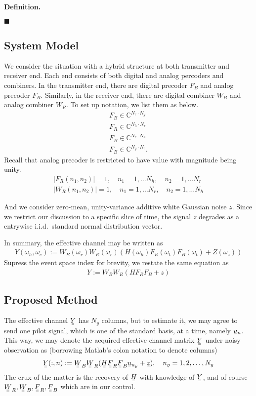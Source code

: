 \documentclass[12pt]{article}
\newcommand{\MB}[1]{\mathbb{#1}}
\newcommand{\V}[1]{\stackunder[1.2pt]{$#1$}{\rule{.9ex}{.075ex}}}
\newcommand{\M}[1]{\V{\V{#1}}}
\newcounter{NumResult}
\newcommand{\myCount}
{
   \stepcounter{NumResult}
   \textbf{\arabic{NumResult}}
}
\newcommand {\Result} [2]
{
   \bigskip
   \myCount \textbf{#1} \par
   {#2} \par
   \hfill \(\blacksquare\)
   \bigskip
}
\begin{document}
\Result
{Definition.}
{
}

\subsection{System Model}

We consider the situation with a hybrid structure at both transmitter and receiver end.
Each end consists of both digital and analog percoders and combiners.
In the transmitter end, there are digital precoder \(F_B\) and analog precoder \(F_R\).
Similarly, in the receiver end, there are digital combiner \(W_B\) and analog combiner \(W_R\).
To set up notation, we list them as below.
\begin{gather}
F_B \in \MB{C}^{N_r \cdot N_y} \\
F_R \in \MB{C}^{N_h \cdot N_r} \\
F_B \in \MB{C}^{N_r \cdot N_h} \\
F_B \in \MB{C}^{N_y \cdot N_r}.
\end{gather}
Recall that analog precoder is restricted to have value with magnitude being unity.
\begin{gather}
 |F_R(n_1,n_2)| =1, \quad
 n_1 =1, \dotsc N_h, \quad
n_2 =1, \dotsc N_r \\
 |W_R(n_1,n_2)| =1, \quad
 n_1 =1, \dotsc N_r, \quad
n_2 =1, \dotsc N_h
\end{gather}

And we consider zero-mean, unity-variance additive white Gaussian noise \(z\).
Since we restrict our discussion to a specific slice of time, the signal \(z\) degrades as a entrywise i.i.d.\ standard normal distribution vector.

In summary, the effective channel may be written as
\begin{gather}
Y (\omega_h, \omega_e)
:=W_B(\omega_r) W_R(\omega_r) ( H(\omega_h) F_R(\omega_t) F_B(\omega_t) +Z(\omega_z) )
\end{gather}
Supress the event space index for brevity, we restate the same equation as
\begin{gather}
Y
:=W_B W_R ( H F_R F_B +z )
\end{gather}

\subsection{Proposed Method}

The effective channel \(\M{Y}\) has \(N_y\) columns, but to estimate it, we may agree to send one pilot signal, which is one of the standard basis, at a time, namely \(\V{u}_n\).
This way, we may denote the acquired effective channel matrix \(\M{Y}\) under noisy observation as (borrowing Matlab's colon notation to denote columns)
\begin{gather}
\M{Y}(:,n)
:=\M{W}_B \M{W}_R ( \M{H} \M{F}_R \M{F}_B \V{u}_{n_y} +\V{z} ), \quad
n_y =1, 2, \dotsc, N_y
\end{gather}
The crux of the matter is the recovery of \(\M{H}\) with knowledge of \(\M{Y}\), and of course \(\M{W}_R, \M{W}_B, \M{F}_R, \M{F}_B\) which are in our control.
\end{document}
